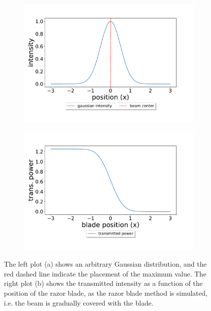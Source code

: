 \begin{figure}[h!]
    \centering
    \begin{subfigure}[b]{0.49\textwidth}
        \includegraphics[width=\textwidth]{figures/arbitrary_gaussian.pdf}
        \caption{}
        \label{fig:arb_gaussian}
    \end{subfigure}
    \begin{subfigure}[b]{0.49\textwidth}
        \includegraphics[width=\textwidth]{figures/razor_blade_err_function.pdf}
        \caption{}
        \label{fig:razor_blade}
    \end{subfigure}
    \caption{The left plot (a) shows an arbitrary Gaussian distribution, and the red dashed line indicate the placement of the maximum value. The right plot (b) shows the transmitted intensity as a function of the position of the razor blade, as the razor blade method is simulated, i.e. the beam is gradually covered with the blade.}
    \label{fig:razor_blade_method}
\end{figure}

